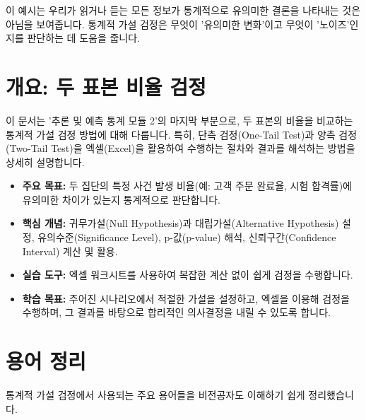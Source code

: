 \documentclass[11pt,a4paper]{article}
\theoremstyle{definition}
\begin{document}
\begin{warningbox}[title=통계적 유의성과 뉴스 가치]
이 예시는 우리가 읽거나 듣는 모든 정보가 통계적으로 유의미한 결론을 나타내는 것은 아님을 보여줍니다. 통계적 가설 검정은 무엇이 '유의미한 변화'이고 무엇이 '노이즈'인지를 판단하는 데 도움을 줍니다.
\end{warningbox}

\newpage

\newpage
\section{개요: 두 표본 비율 검정}

이 문서는 '추론 및 예측 통계 모듈 2'의 마지막 부분으로, 두 표본의 비율을 비교하는 통계적 가설 검정 방법에 대해 다룹니다. 특히, 단측 검정(One-Tail Test)과 양측 검정(Two-Tail Test)을 엑셀(Excel)을 활용하여 수행하는 절차와 결과를 해석하는 방법을 상세히 설명합니다.

\begin{itemize}
    \item \textbf{주요 목표:} 두 집단의 특정 사건 발생 비율(예: 고객 주문 완료율, 시험 합격률)에 유의미한 차이가 있는지 통계적으로 판단합니다.
    \item \textbf{핵심 개념:} 귀무가설(Null Hypothesis)과 대립가설(Alternative Hypothesis) 설정, 유의수준(Significance Level), p-값(p-value) 해석, 신뢰구간(Confidence Interval) 계산 및 활용.
    \item \textbf{실습 도구:} 엑셀 워크시트를 사용하여 복잡한 계산 없이 쉽게 검정을 수행합니다.
    \item \textbf{학습 목표:} 주어진 시나리오에서 적절한 가설을 설정하고, 엑셀을 이용해 검정을 수행하며, 그 결과를 바탕으로 합리적인 의사결정을 내릴 수 있도록 합니다.
\end{itemize}

\newpage
\section{용어 정리}

통계적 가설 검정에서 사용되는 주요 용어들을 비전공자도 이해하기 쉽게 정리했습니다.
\end{document}
